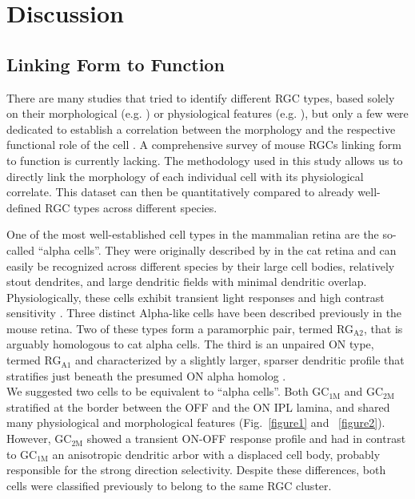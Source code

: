 \chapter{Discussion}

\section{Linking Form to Function}
There are many studies that tried to identify different RGC types, based solely on their morphological (e.g. \citealp{voelgyi09}) or physiological features (e.g. \citealp{farrow11}), but only a few were dedicated to establish a correlation between the morphology and the respective functional role of the cell \citep{pang03, weng05, berson08}. A comprehensive survey of mouse RGCs linking form to function is currently lacking. The methodology used in this study allows us to directly link the morphology of each individual cell with its physiological correlate. This dataset can then be quantitatively compared to already well-defined RGC types across different species.  

One of the most well-established cell types in the mammalian retina are the so-called “alpha cells”. They were originally described by \citet{boycott74} in the cat retina and can easily be recognized across different species by their large cell bodies, relatively stout dendrites, and large dendritic fields with minimal dendritic overlap. Physiologically, these cells exhibit transient light responses and high contrast sensitivity \citep{peichl81}. Three distinct Alpha-like cells have been described previously in the mouse retina. Two of these types form a paramorphic pair, termed RG$_{\text{A2}}$, that is arguably homologous to cat alpha cells. The third is an unpaired ON type, termed RG$_{\text{A1}}$ and characterized by a slightly larger, sparser dendritic profile that stratifies just beneath the presumed ON alpha homolog \citep{sun02, berson08}.\\
We suggested two cells to be equivalent to “alpha cells”. Both GC$_{\text{1M}}$ and GC$_{\text{2M}}$ stratified at the border between the OFF and the ON IPL lamina, and shared many physiological and morphological features (Fig.~\ref{figure1} and ~\ref{figure2}). However, GC$_{\text{2M}}$ showed a transient ON-OFF response profile and had in contrast to GC$_{\text{1M}}$ an anisotropic dendritic arbor with a displaced cell body, probably responsible for the strong direction selectivity. Despite these differences, both cells were classified previously \citep{kong05, voelgyi09} to belong to the same RGC cluster. 

